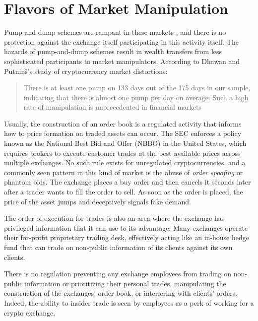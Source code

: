 \section{Flavors of Market Manipulation}


Pump-and-dump schemes are rampant in these markets
\cite{shifflett_traders_2018}, and there is no protection against the exchange
itself participating in this activity itself. The hazards of pump-and-dump
schemes result in wealth transfers from less sophisticated participants to
market manipulators. According to Dhawan and Putniņš's study
\cite{dhawan_new_2020} of cryptocurrency market distortions:

\begin{quote}
There is at least one pump on 133 days out of the 175 days in our
sample, indicating that there is almost one pump per day on average.
Such a high rate of manipulation is unprecedented in financial markets
\end{quote}

Usually, the construction of an order book is a regulated activity that informs
how to price formation on traded assets can occur. The SEC enforces a policy
known as the National Best Bid and Offer (NBBO) in the United States, which
requires brokers to execute customer trades at the best available prices across
multiple exchanges. No such rule exists for unregulated cryptocurrencies, and a
commonly seen pattern in this kind of market is the abuse of \textit{order
spoofing} or phantom bids. The exchange places a buy order and then cancels it
seconds later after a trader wants to fill the order to sell. As soon as the
order is placed, the price of the asset jumps and deceptively signals fake
demand.
\cite{cong_crypto_2020}


The order of execution for trades is also an area where the exchange has
privileged information that it can use to its advantage. Many exchanges operate
their for-profit proprietary trading desk, effectively acting like an in-house
hedge fund that can trade on non-public information of its clients against its
own clients.

There is no regulation preventing any exchange employees from trading on
non-public information or prioritizing their personal trades, manipulating the
construction of the exchanges' order book, or interfering with clients' orders.
Indeed, the ability to insider trade is seen by employees as a perk of working
for a crypto exchange.

